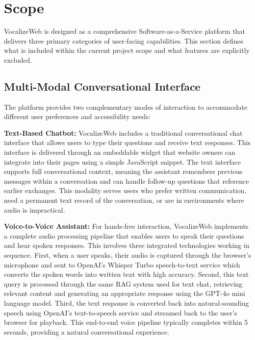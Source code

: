 \section{Scope}

VocalizeWeb is designed as a comprehensive Software-as-a-Service platform that delivers three primary categories of user-facing capabilities. This section defines what is included within the current project scope and what features are explicitly excluded.

\subsection{Multi-Modal Conversational Interface}

The platform provides two complementary modes of interaction to accommodate different user preferences and accessibility needs:

\textbf{Text-Based Chatbot:} VocalizeWeb includes a traditional conversational chat interface that allows users to type their questions and receive text responses. This interface is delivered through an embeddable widget that website owners can integrate into their pages using a simple JavaScript snippet. The text interface supports full conversational context, meaning the assistant remembers previous messages within a conversation and can handle follow-up questions that reference earlier exchanges. This modality serves users who prefer written communication, need a permanent text record of the conversation, or are in environments where audio is impractical.

\textbf{Voice-to-Voice Assistant:} For hands-free interaction, VocalizeWeb implements a complete audio processing pipeline that enables users to speak their questions and hear spoken responses. This involves three integrated technologies working in sequence. First, when a user speaks, their audio is captured through the browser's microphone and sent to OpenAI's Whisper Turbo speech-to-text service which converts the spoken words into written text with high accuracy. Second, this text query is processed through the same RAG system used for text chat, retrieving relevant content and generating an appropriate response using the GPT-4o mini language model. Third, the text response is converted back into natural-sounding speech using OpenAI's text-to-speech service and streamed back to the user's browser for playback. This end-to-end voice pipeline typically completes within 5 seconds, providing a natural conversational experience.

